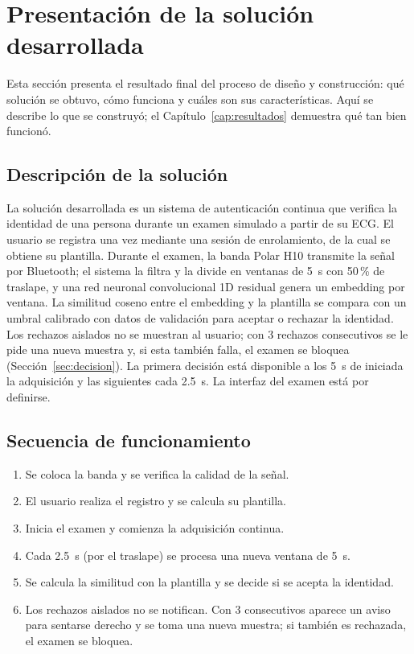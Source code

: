 \section{Presentación de la solución desarrollada}
\label{sec:solucion}

Esta sección presenta el resultado final del proceso de diseño y construcción: qué solución se obtuvo, cómo funciona y cuáles son sus características. Aquí se describe lo que se construyó; el Capítulo~\ref{cap:resultados} demuestra qué tan bien funcionó.

\subsection{Descripción de la solución}

La solución desarrollada es un sistema de autenticación continua que verifica la identidad de una persona durante un examen simulado a partir de su ECG. El usuario se registra una vez mediante una sesión de enrolamiento, de la cual se obtiene su plantilla. Durante el examen, la banda Polar H10 transmite la señal por Bluetooth; el sistema la filtra y la divide en ventanas de 5~s con 50\,\% de traslape, y una red neuronal convolucional 1D residual genera un embedding por ventana. La similitud coseno entre el embedding y la plantilla se compara con un umbral calibrado con datos de validación para aceptar o rechazar la identidad. Los rechazos aislados no se muestran al usuario; con 3 rechazos consecutivos se le pide una nueva muestra y, si esta también falla, el examen se bloquea (Sección~\ref{sec:decision}). La primera decisión está disponible a los 5~s de iniciada la adquisición y las siguientes cada 2.5~s. La interfaz del examen está por definirse.

\subsection{Secuencia de funcionamiento}

\begin{enumerate}
  \item Se coloca la banda y se verifica la calidad de la señal.
  \item El usuario realiza el registro y se calcula su plantilla.
  \item Inicia el examen y comienza la adquisición continua.
  \item Cada 2.5~s (por el traslape) se procesa una nueva ventana de 5~s.
  \item Se calcula la similitud con la plantilla y se decide si se acepta la identidad.
  \item Los rechazos aislados no se notifican. Con 3 consecutivos aparece un aviso para sentarse derecho y se toma una nueva muestra; si también es rechazada, el examen se bloquea.
\end{enumerate}

